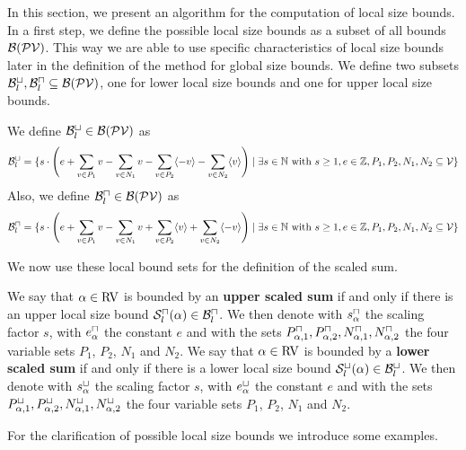 In this section, we present an algorithm for the computation of local size bounds.
In a first step, we define the possible local size bounds as a subset of all bounds $\mathcal{B}(\mathcal{PV})$.
This way we are able to use specific characteristics of local size bounds later in the definition of the method for global size bounds.
We define two subsets $\mathcal{B}^\sqcup_l, \mathcal{B}^\sqcap_l \subseteq \mathcal{B}(\mathcal{PV})$, one for lower local size bounds and one for upper local size bounds.

\begin{definition}
  We define $\mathcal{B}^\sqcup_l \in \mathcal{B}(\mathcal{PV})$ as 
  \[ \mathcal{B}^\sqcup_l = \lbrace 
    s \cdot \left(
        e
      + \sum_{v \in P_1} v
      - \sum_{v \in N_1} v
      - \sum_{v \in P_2} \langle-v\rangle
      - \sum_{v \in N_2} \langle v\rangle
      \right) \mid \exists s \in \mathbb{N} \text{ with } s \geq 1, e \in \mathbb{Z}, P_1, P_2, N_1, N_2 \subseteq \mathcal{V}  \rbrace\]
  Also, we define $\mathcal{B}^\sqcap_l \in \mathcal{B}(\mathcal{PV})$ as 
  \[ \mathcal{B}^\sqcap_l = \lbrace 
    s \cdot \left(
        e
      + \sum_{v \in P_1} v
      - \sum_{v \in N_1} v
      + \sum_{v \in P_2} \langle v\rangle
      + \sum_{v \in N_2} \langle-v\rangle
      \right) \mid \exists s \in \mathbb{N} \text{ with } s \geq 1, e \in \mathbb{Z}, P_1, P_2, N_1, N_2 \subseteq \mathcal{V}  \rbrace\]
\end{definition}

We now use these local bound sets for the definition of the scaled sum.

\begin{definition}
  We say that $\alpha \in \text{RV}$ is bounded by an \textbf{upper scaled sum} if and only if there is an upper local size bound ${\mathcal{S}^\sqcap_l}(\alpha) \in \mathcal{B}^\sqcap_l$.
  We then denote with $s^\sqcap_\alpha$ the scaling factor $s$, with $e^\sqcap_\alpha$ the constant $e$ and with the sets $P_{\alpha,1}^\sqcap, P_{\alpha,2}^\sqcap, N_{\alpha,1}^\sqcap, N_{\alpha,2}^\sqcap$ the four variable sets $P_1$, $P_2$, $N_1$ and $N_2$.
  We say that $\alpha \in \text{RV}$ is bounded by a \textbf{lower scaled sum} if and only if there is a lower local size bound ${\mathcal{S}^\sqcup_l}(\alpha) \in \mathcal{B}^\sqcup_l$.
  We then denote with $s^\sqcup_\alpha$ the scaling factor $s$, with $e^\sqcup_\alpha$ the constant $e$ and with the sets $P_{\alpha,1}^\sqcup, P_{\alpha,2}^\sqcup, N_{\alpha,1}^\sqcup, N_{\alpha,2}^\sqcup$ the four variable sets $P_1$, $P_2$, $N_1$ and $N_2$.
\end{definition}

For the clarification of possible local size bounds we introduce some examples.

